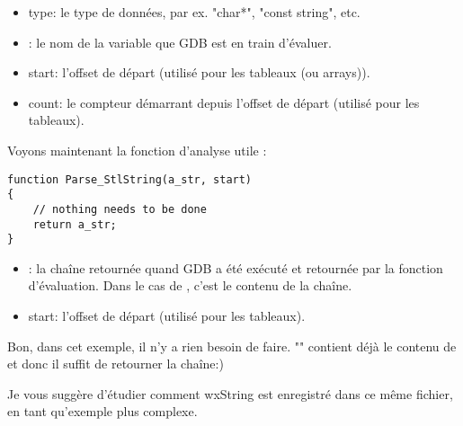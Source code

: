 \begin{itemize}
\item type: le type de données, par ex. "char*", "const string", etc.
\item {}: le nom de la variable que GDB est en train d'évaluer.
\item start: l'offset de départ (utilisé pour les tableaux (ou arrays)).
\item count: le compteur démarrant depuis l'offset de départ (utilisé pour les tableaux).
\end{itemize}

Voyons maintenant la fonction d'analyse utile :

\begin{lstlisting}
function Parse_StlString(a_str, start)
{
    // nothing needs to be done
    return a_str;
}
\end{lstlisting}

\begin{itemize}
\item {}: la chaîne retournée quand GDB a été exécuté et retournée par la fonction d'évaluation. Dans le cas de , c'est le contenu de la chaîne.
\item start: l'offset de départ (utilisé pour les tableaux).
\end{itemize}

Bon, dans cet exemple, il n'y a rien besoin de faire. "" contient déjà le contenu de  et donc il suffit de retourner la chaîne:)

Je vous suggère d'étudier comment wxString est enregistré dans ce même fichier, en tant qu'exemple plus complexe. 
